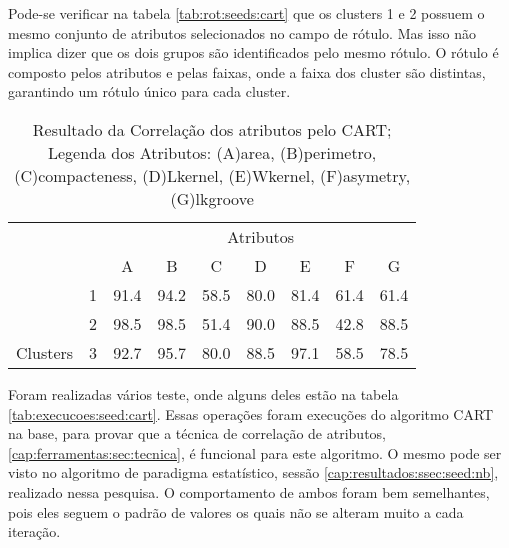 Pode-se verificar na tabela \ref{tab:rot:seeds:cart} que os clusters 1 e 2 possuem o mesmo conjunto de atributos selecionados no campo de rótulo. Mas isso não implica dizer que os dois grupos são identificados pelo mesmo rótulo. O rótulo é composto pelos atributos e pelas faixas, onde a faixa  dos cluster são distintas, garantindo um rótulo único para cada cluster.



\begin{table}[!h]
    
    \caption{Resultado da Correlação dos atributos pelo CART; Legenda dos Atributos: (A)area, (B)perimetro, (C)compacteness, (D)Lkernel, (E)Wkernel, (F)asymetry, (G)lkgroove}    
    \centering
   \small\addtolength{\tabcolsep}{1pt}
    \begin{tabular}{|cl|c|c|c|c|c|c|c|}
        \hline \hline
                                &   & \multicolumn{7}{c|}{Atributos}          \\ \cline{3-9} 
        \multicolumn{1}{|l}{}                            &   & A    & B & C & D & E & F & G \\ \hline
        \multicolumn{1}{|c|}{}                           & 1 & 91.4 & 94.2   & 58.5      & 80.0 & 81.4 & 61.4   & 61.4   \\ \cline{2-9} 
        \multicolumn{1}{|c|}{}                           & 2 & 98.5 & 98.5   & 51.4      & 90.0 & 88.5 & 42.8  & 88.5  \\ \cline{2-9} 
        \multicolumn{1}{|c|}{\multirow{-3}{*}{Clusters}} & 3 & 92.7 & 95.7   & 80.0      & 88.5 & 97.1 & 58.5  & 78.5  \\ \hline
    \end{tabular}
    \label{tab:matrelevancia:seeds:cart} 
\end{table}

Foram realizadas vários teste, onde alguns deles estão na tabela \ref{tab:execucoes:seed:cart}. Essas operações foram execuções do algoritmo CART na base, para provar que a técnica de correlação de atributos, \ref{cap:ferramentas:sec:tecnica}, é funcional para este algoritmo. O mesmo pode ser visto no algoritmo de paradigma estatístico, sessão \ref{cap:resultados:ssec:seed:nb}, realizado nessa pesquisa. O  comportamento de ambos foram bem semelhantes, pois eles seguem o padrão de valores os quais não se alteram muito a cada iteração.

